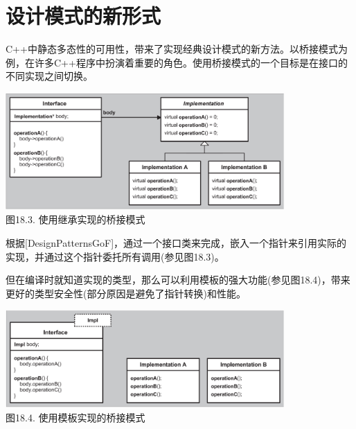 \section{设计模式的新形式}
C++中静态多态性的可用性，带来了实现经典设计模式的新方法。以桥接模式为例，在许多C++程序中扮演着重要的角色。使用桥接模式的一个目标是在接口的不同实现之间切换。

\begin{center}
\includegraphics[width=0.8\textwidth]{part3/ch18/images/3.png} \\
图18.3. 使用继承实现的桥接模式
\end{center}

根据[DesignPatternsGoF]，通过一个接口类来完成，嵌入一个指针来引用实际的实现，并通过这个指针委托所有调用(参见图18.3)。

但在编译时就知道实现的类型，那么可以利用模板的强大功能(参见图18.4)，带来更好的类型安全性(部分原因是避免了指针转换)和性能。

\begin{center}
\includegraphics[width=0.8\textwidth]{part3/ch18/images/4.png} \\
图18.4. 使用模板实现的桥接模式
\end{center}










































